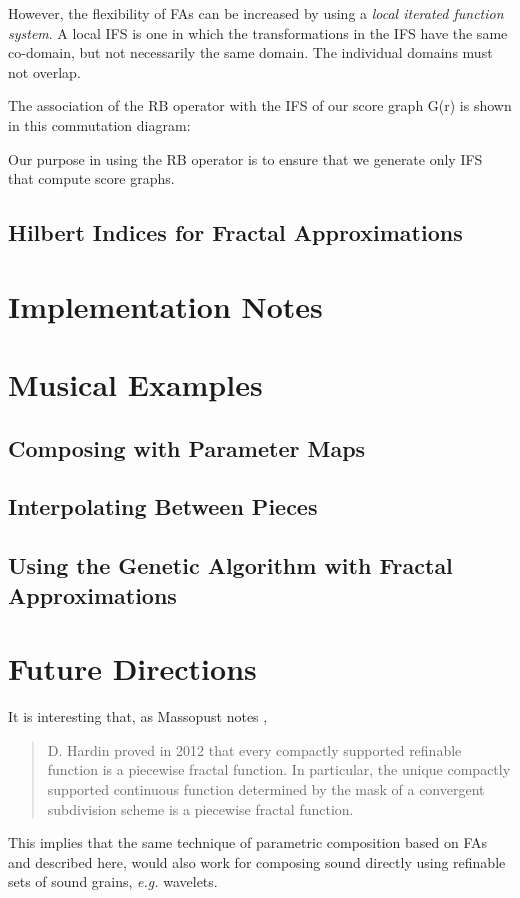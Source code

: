 \documentclass[english,11pt,letterpaper,onecolumn]{scrartcl}
\numberwithin{equation}{section}
\begin{document}

However, the flexibility of FAs can be increased by using a 
\textit{local iterated function system}. A local IFS is one in which the 
transformations in the IFS have the same co-domain, but not necessarily the 
same domain. The individual domains must not overlap.

The association of the RB operator with the IFS of our score graph G(r) is 
shown in this commutation diagram:

Our purpose in using the RB operator is to ensure that we generate only IFS 
that compute score graphs.

\subsection{Hilbert Indices for Fractal Approximations}

\section{Implementation Notes}

\section{Musical Examples}

\subsection{Composing with Parameter Maps}

\subsection{Interpolating Between Pieces}

\subsection{Using the Genetic Algorithm with Fractal Approximations}

\section{Future Directions}

It is interesting that, as Massopust notes \cite{massopust2017}, 
\begin{quote}D. Hardin proved in 2012 that every compactly supported 
refinable function is a piecewise fractal function. In particular, the unique 
compactly supported continuous function determined by the mask of a convergent 
subdivision scheme is a piecewise fractal function. \end{quote} 
This implies that the same technique of parametric 
composition based on FAs and described here, would also work for composing 
sound directly using refinable sets of sound grains, \textit{e.g.} wavelets.
\end{document}
